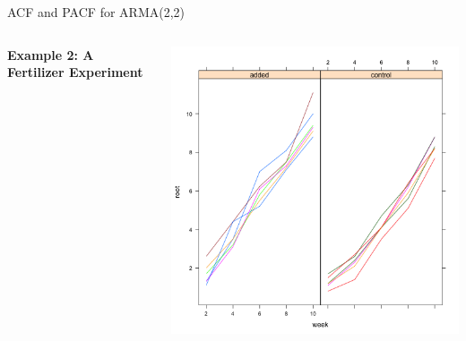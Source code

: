 \documentclass{beamer}
\begin{document}
\begin{frame}[fragile]{ACF and PACF for ARMA(2,2)}
\begin{columns}
\begin{column}{0.5\textwidth}
      \end{column}
  \end{columns}
\end{frame}

\begin{frame}[fragile]{}
\begin{columns}
    \begin{column}{0.4\textwidth}
        \huge\textbf{Example 2: A Fertilizer Experiment}
    \end{column}
    \begin{column}{0.6\textwidth}
        \includegraphics[width=\textwidth]{lectures/day_4_GLS/figures/unnamed-chunk-30-1.png}
    \end{column}
\end{columns}
\end{frame}
\end{document}
